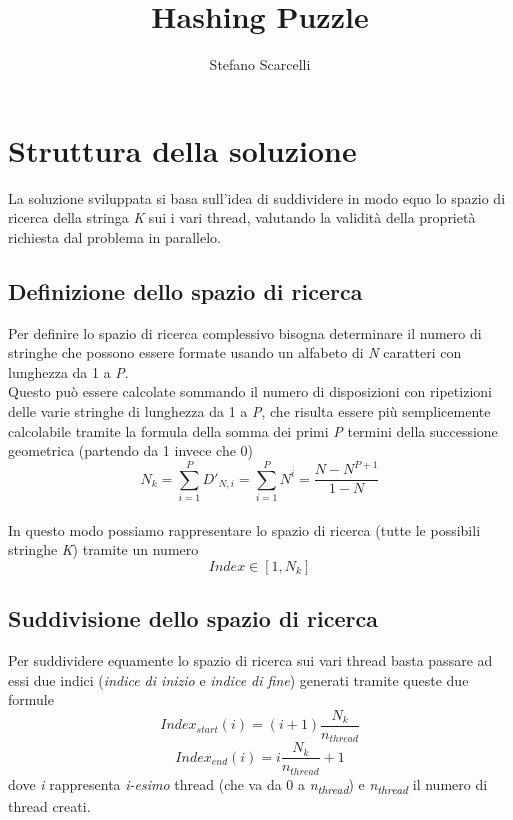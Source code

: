 \documentclass{article}
\title{Hashing Puzzle}
\author{Stefano Scarcelli}
\begin{document}
    \maketitle
    \newpage    %

    \tableofcontents
    \newpage    %

    \section{Struttura della soluzione}
    La soluzione sviluppata si basa sull'idea di suddividere in modo equo lo spazio di ricerca della stringa \textit{K} sui i vari thread, valutando la validità della proprietà richiesta dal problema in parallelo.

    \subsection{Definizione dello spazio di ricerca}
    Per definire lo spazio di ricerca complessivo bisogna determinare il numero di stringhe che possono essere formate usando un alfabeto di \textit{N} caratteri con lunghezza da 1 a \textit{P}.\\

    Questo può essere calcolate sommando il numero di disposizioni con ripetizioni delle varie stringhe di lunghezza da 1 a \textit{P}, che risulta essere più semplicemente calcolabile tramite la formula della somma dei primi \textit{P} termini della successione geometrica (partendo da 1 invece che 0)
    \[ N_{k} = \sum_{i=1}^{P} D'_{N,i} = \sum_{i=1}^{P} N^i = \frac{N-N^{P+1}}{1-N} \]
    \\
    In questo modo possiamo rappresentare lo spazio di ricerca (tutte le possibili stringhe \textit{K}) tramite un numero
    \[ Index \in [1, N_{k}] \]

    \subsection{Suddivisione dello spazio di ricerca}
    Per suddividere equamente lo spazio di ricerca sui vari thread basta passare ad essi due indici (\textsl{indice di inizio} e \textsl{indice di fine}) generati tramite queste due formule
    \[ Index_{start}(i) = (i+1)\frac{N_{k}}{n_{thread}} \]
    \[ Index_{end}(i) = i\frac{N_{k}}{n_{thread}}+1 \]
    dove \textit{i} rappresenta \textsl{i-esimo} thread (che va da 0 a \textit{n\textsubscript{thread}}) e \textit{n\textsubscript{thread}} il numero di thread creati.
\end{document}
